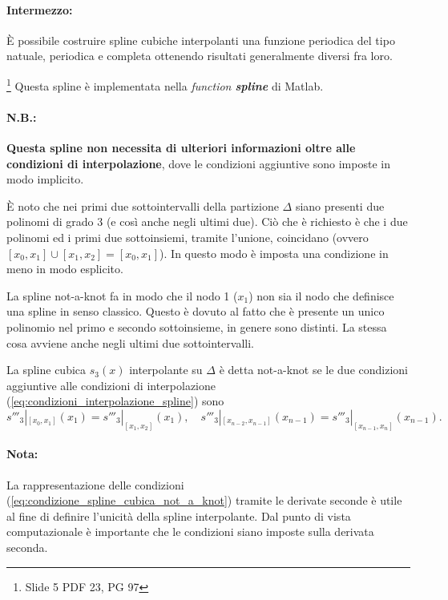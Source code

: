 \paragraph{Intermezzo:}È possibile costruire spline cubiche interpolanti una funzione periodica  del tipo natuale, periodica e completa ottenendo risultati generalmente diversi fra loro.

\begin{remark}\footnote{Slide 5 PDF 23, PG 97}
    Questa spline è implementata nella \textit{function \textbf{spline}} di Matlab.
\end{remark}

\paragraph{N.B.:} \textbf{Questa spline non necessita di ulteriori informazioni oltre alle condizioni di interpolazione}, dove le condizioni aggiuntive sono imposte in modo implicito. 

È noto che nei primi due sottointervalli della partizione $\Delta$ siano presenti due polinomi di grado 3 (e così anche negli ultimi due). Ciò che è richiesto è che i due polinomi ed i primi due sottoinsiemi, tramite l'unione, coincidano (ovvero $[x_0,x_1]\cup[x_1,x_2]=[x_0,x_1]$). In questo modo è imposta una condizione in meno in modo esplicito. 

La spline not-a-knot fa in modo che il nodo 1 ($x_1$) non sia il nodo che definisce una spline in senso classico. Questo è dovuto al fatto che è presente un unico polinomio nel primo e secondo sottoinsieme, in genere sono distinti. La stessa cosa avviene anche negli ultimi due sottointervalli.

\begin{definition}
	La spline cubica $s_3(x)$ interpolante su $\Delta$ è detta not-a-knot se le due condizioni aggiuntive alle condizioni di interpolazione (\ref{eq:condizioni_interpolazione_spline}) sono 
	\begin{equation}\label{eq:condizione_spline_cubica_not_a_knot}
		s'''_3|_{[x_0,x_1]}(x_1)=s'''_3|_{[x_1,x_2]}(x_1),\quad 	s'''_3|_{[x_{n-2},x_{n-1}]}(x_{n-1})=s'''_3|_{[x_{n-1},x_n]}(x_{n-1}).
	\end{equation}
\end{definition}

\paragraph{Nota:} La rappresentazione delle condizioni (\ref{eq:condizione_spline_cubica_not_a_knot}) tramite le derivate seconde è utile al fine di definire l'unicità della spline interpolante. Dal punto di vista computazionale è importante che le condizioni siano imposte sulla derivata seconda.

